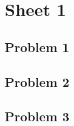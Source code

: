 \documentclass[main.tex]{subfiles}
\begin{document}
\section{Sheet 1}

\subsection{Problem 1}

\subsection{Problem 2}

\subsection{Problem 3}
\end{document}
